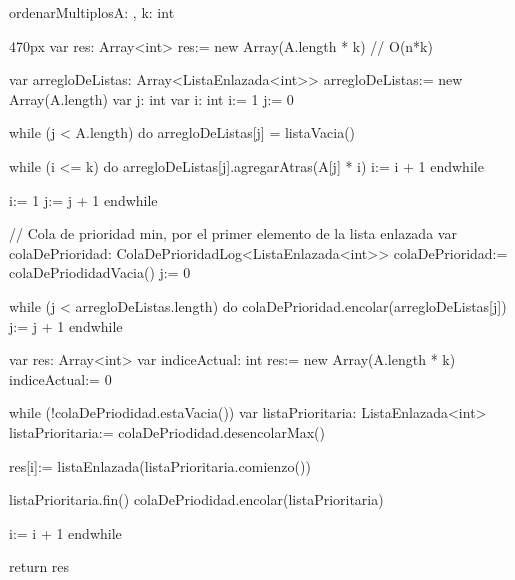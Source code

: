 \documentclass[10pt,a4paper]{article}
\begin{document}
\begin{proc}{ordenarMultiplos}{\In A: , \In k: int}{}
  \begin{ImplementationCode}{470px}
      var res: Array<int>
          res:= new Array(A.length * k) // O(n*k)

      var arregloDeListas: Array<ListaEnlazada<int>>
          arregloDeListas:= new Array(A.length)
      var j: int
      var i: int
          i:= 1
          j:= 0

      while (j < A.length) do
        arregloDeListas[j] = listaVacia()

        while (i <= k) do
          arregloDeListas[j].agregarAtras(A[j] * i)
          i:= i + 1
        endwhile

        i:= 1
        j:= j + 1
      endwhile

      // Cola de prioridad min, por el primer elemento de la lista enlazada
      var colaDePrioridad: ColaDePrioridadLog<ListaEnlazada<int>>
          colaDePrioridad:= colaDePriodidadVacia()
          j:= 0

      while (j < arregloDeListas.length) do
        colaDePrioridad.encolar(arregloDeListas[j])
        j:= j + 1
      endwhile

      var res: Array<int>
      var indiceActual: int
          res:= new Array(A.length * k)
          indiceActual:= 0

      while (!colaDePriodidad.estaVacia())
        var listaPrioritaria: ListaEnlazada<int>
            listaPrioritaria:= colaDePriodidad.desencolarMax()
        
        res[i]:= listaEnlazada(listaPrioritaria.comienzo())

        listaPrioritaria.fin()
        colaDePriodidad.encolar(listaPrioritaria)

        i:= i + 1
      endwhile

      return res
  \end{ImplementationCode}
\end{proc}
\newpage


\end{document}
